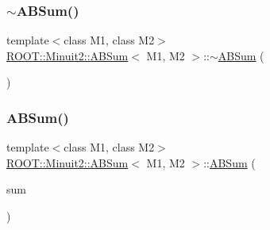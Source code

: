 \subsubsection{\texorpdfstring{$\sim$ABSum()}{~ABSum()}\hspace{0.1cm}{\footnotesize\ttfamily [3/3]}}
{\footnotesize\ttfamily template$<$class M1, class M2$>$ \\
\mbox{\hyperlink{classROOT_1_1Minuit2_1_1ABSum}{R\+O\+O\+T\+::\+Minuit2\+::\+A\+B\+Sum}}$<$ M1, M2 $>$\+::$\sim$\mbox{\hyperlink{classROOT_1_1Minuit2_1_1ABSum}{A\+B\+Sum}} (\begin{DoxyParamCaption}{ }\end{DoxyParamCaption})\hspace{0.3cm}{\ttfamily [inline]}}

\mbox{\label{classROOT_1_1Minuit2_1_1ABSum_ae687b46f660f6db5ca9c4626fd5e5a4b}} 
\subsubsection{\texorpdfstring{ABSum()}{ABSum()}\hspace{0.1cm}{\footnotesize\ttfamily [8/9]}}
{\footnotesize\ttfamily template$<$class M1, class M2$>$ \\
\mbox{\hyperlink{classROOT_1_1Minuit2_1_1ABSum}{R\+O\+O\+T\+::\+Minuit2\+::\+A\+B\+Sum}}$<$ M1, M2 $>$\+::\mbox{\hyperlink{classROOT_1_1Minuit2_1_1ABSum}{A\+B\+Sum}} (\begin{DoxyParamCaption}\item[{const \mbox{\hyperlink{classROOT_1_1Minuit2_1_1ABSum}{A\+B\+Sum}}$<$ M1, M2 $>$ \&}]{sum }\end{DoxyParamCaption})\hspace{0.3cm}{\ttfamily [inline]}}

\mbox{\label{classROOT_1_1Minuit2_1_1ABSum_a4f9776ad68bfb91ccf613b367ecf6730}} 
